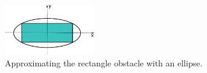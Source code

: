 \documentclass[letterpaper, 10 pt, conference]{ieeeconf}
\begin{document}
	\begin{figure}
		\centering		
		\includegraphics[width=0.35\textwidth]{figures/approx_ellipse}
		\caption{Approximating the rectangle obstacle with an ellipse.}
		\label{fig:approx_ellipse}
	\end{figure}
	
	
	
	\addtolength{\textheight}{-12cm}   %
	
	
	
	
	
\end{document}
